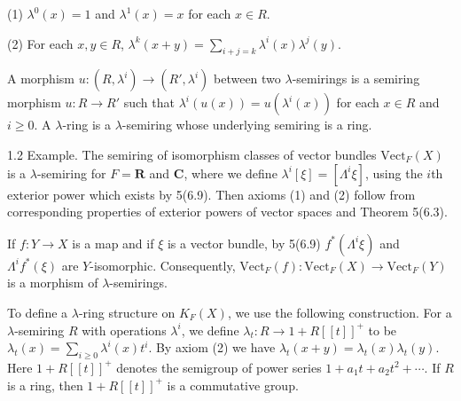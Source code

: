 (1) $\lambda^0(x) = 1$ and $\lambda^1(x) = x$ for each $x \in R$.

(2) For each $x, y \in R$, $\lambda^k(x + y) = \sum_{i+j=k} \lambda^i(x)\lambda^j(y)$.

A morphism $u: (R, \lambda^i) \rightarrow (R', \lambda^i)$ between two $\lambda$-semirings is a semiring morphism $u: R \rightarrow R'$ such that $\lambda^i(u(x)) = u(\lambda^i(x))$ for each $x \in R$ and $i \geq 0$. A $\lambda$-ring is a $\lambda$-semiring whose underlying semiring is a ring.

1.2 Example. The semiring of isomorphism classes of vector bundles $\text{Vect}_F(X)$ is a $\lambda$-semiring for $F = \mathbf{R}$ and $\mathbf{C}$, where we define $\lambda^i[\xi] = [\Lambda^i\xi]$, using the $i$th exterior power which exists by 5(6.9). Then axioms (1) and (2) follow from corresponding properties of exterior powers of vector spaces and Theorem 5(6.3).

If $f: Y \rightarrow X$ is a map and if $\xi$ is a vector bundle, by 5(6.9) $f^*(\Lambda^i \xi)$ and $\Lambda^i f^*(\xi)$ are $Y$-isomorphic. Consequently, $\text{Vect}_F(f): \text{Vect}_F(X) \rightarrow \text{Vect}_F(Y)$ is a morphism of $\lambda$-semirings.

To define a $\lambda$-ring structure on $K_F(X)$, we use the following construction. For a $\lambda$-semiring $R$ with operations $\lambda^i$, we define $\lambda_t: R \rightarrow 1 + R[[t]]^+$ to be $\lambda_t(x) = \sum_{i \geq 0} \lambda^i(x)t^i$. By axiom (2) we have $\lambda_t(x + y) = \lambda_t(x)\lambda_t(y)$. Here $1 + R[[t]]^+$ denotes the semigroup of power series $1 + a_1t + a_2t^2 + \cdots$. If $R$ is a ring, then $1 + R[[t]]^+$ is a commutative group.
